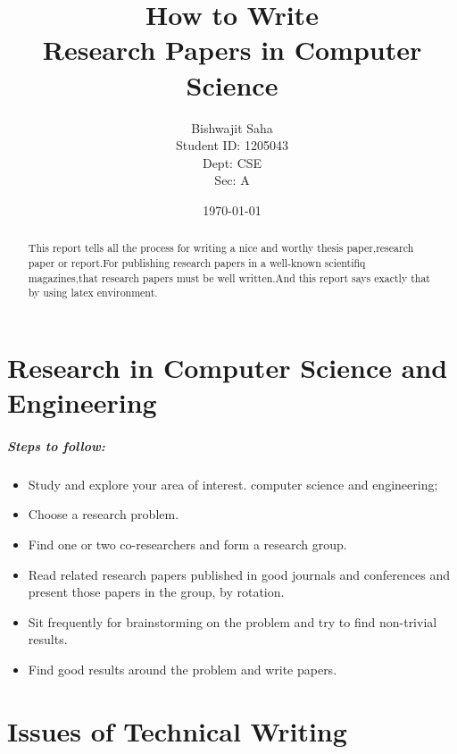 \documentclass[]{report}
\title{How to Write\\
Research Papers in Computer Science}
\author{Bishwajit Saha \\
		Student ID: 1205043\\
		Dept: CSE \\
		Sec: A
		}
\date{\today}
\begin{document}
  \maketitle
  \begin{abstract}
  This report tells all the process for writing a nice and worthy thesis paper,research paper or report.For publishing research papers in a well-known scientifiq magazines,that research papers must be well written.And this report says exactly that by using latex environment.
  \end{abstract}
  \tableofcontents
  
  
  \chapter{Research in Computer Science and Engineering}
  \paragraph{Steps to follow:}
  \begin{itemize}
  \item Study and explore your area of interest.
computer science and engineering;
  \item Choose a research problem.
  \item Find one or two co-researchers and form a research group.
 \item Read related research papers published in good journals
and conferences and present those papers in the group, by
rotation.
 \item Sit frequently for brainstorming on the problem and try to
find non-trivial results.
\item Find good results around the problem and write papers.
  \end{itemize}
  
  
  \chapter{Issues of Technical Writing}
  
\end{document}
